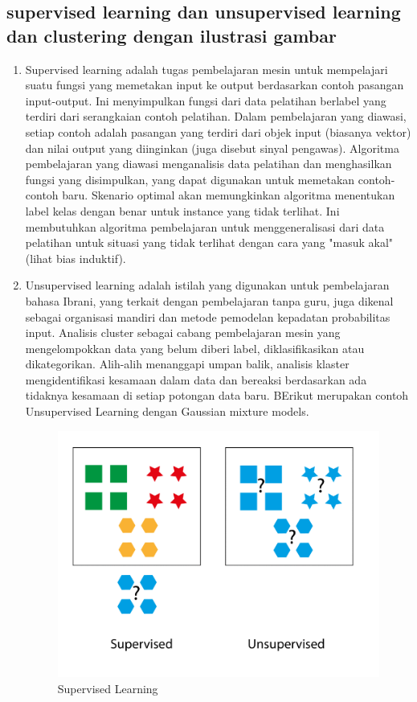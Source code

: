\subsection{supervised learning dan unsupervised learning dan clustering dengan ilustrasi gambar}
\begin{enumerate}
\item Supervised learning adalah tugas pembelajaran mesin untuk mempelajari suatu fungsi yang memetakan input ke output berdasarkan contoh pasangan input-output. Ini menyimpulkan fungsi dari data pelatihan berlabel yang terdiri dari serangkaian contoh pelatihan. Dalam pembelajaran yang diawasi, setiap contoh adalah pasangan yang terdiri dari objek input (biasanya vektor) dan nilai output yang diinginkan (juga disebut sinyal pengawas). Algoritma pembelajaran yang diawasi menganalisis data pelatihan dan menghasilkan fungsi yang disimpulkan, yang dapat digunakan untuk memetakan contoh-contoh baru. Skenario optimal akan memungkinkan algoritma menentukan label kelas dengan benar untuk instance yang tidak terlihat. Ini membutuhkan algoritma pembelajaran untuk menggeneralisasi dari data pelatihan untuk situasi yang tidak terlihat dengan cara yang "masuk akal" (lihat bias induktif).
\item Unsupervised learning adalah istilah yang digunakan untuk pembelajaran bahasa Ibrani, yang terkait dengan pembelajaran tanpa guru, juga dikenal sebagai organisasi mandiri dan metode pemodelan kepadatan probabilitas input. Analisis cluster sebagai cabang pembelajaran mesin yang mengelompokkan data yang belum diberi label, diklasifikasikan atau dikategorikan. Alih-alih menanggapi umpan balik, analisis klaster mengidentifikasi kesamaan dalam data dan bereaksi berdasarkan ada tidaknya kesamaan di setiap potongan data baru. BErikut merupakan contoh Unsupervised Learning dengan Gaussian mixture models.


\begin{figure}[ht]
\centering
\includegraphics[scale=1]{figures/andi/ilustrasi2.PNG}
\caption{Supervised Learning}
\label{ilustrasi gambar}
\end{figure}
\end{enumerate}

